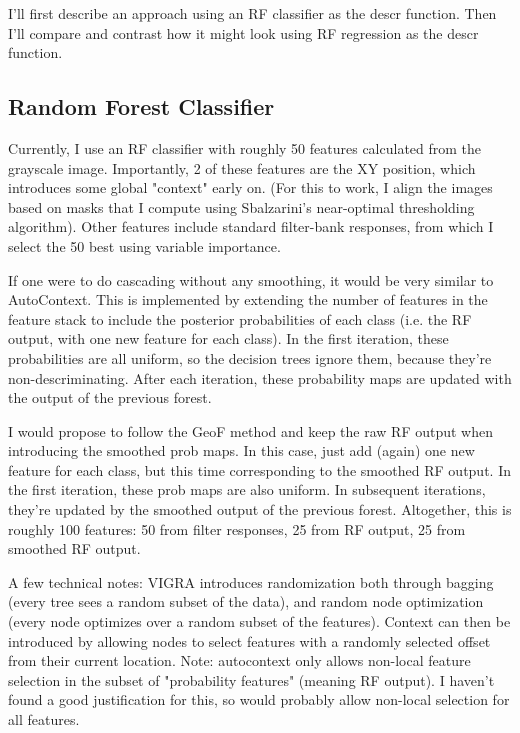 I'll first describe an approach using an RF classifier as the descr function.  Then I'll compare and contrast how it might look using RF regression as the descr function.

\subsection{Random Forest Classifier}

Currently, I use an RF classifier with roughly 50 features calculated from the grayscale image.  Importantly, 2 of these features are the XY position, which introduces some global "context" early on.  (For this to work, I align the images based on masks that I compute using Sbalzarini's near-optimal thresholding algorithm).  Other features include standard filter-bank responses, from which I select the 50 best using variable importance.

If one were to do cascading without any smoothing, it would be very similar to AutoContext.  This is implemented by extending the number of features in the feature stack to include the posterior probabilities of each class (i.e. the RF output, with one new feature for each class).  In the first iteration, these probabilities are all uniform, so the decision trees ignore them, because they're non-descriminating.  After each iteration, these probability maps are updated with the output of the previous forest.

I would propose to follow the GeoF method and keep the raw RF output when introducing the smoothed prob maps.  In this case, just add (again) one new feature for each class, but this time corresponding to the smoothed RF output.  In the first iteration, these prob maps are also uniform.  In subsequent iterations, they're updated by the smoothed output of the previous forest.  Altogether, this is roughly 100 features: 50 from filter responses, 25 from RF output, 25 from smoothed RF output.

A few technical notes: VIGRA introduces randomization both through bagging (every tree sees a random subset of the data), and random node optimization (every node optimizes over a random subset of the features).  Context can then be introduced by allowing nodes to select features with a randomly selected offset from their current location.  Note: autocontext only allows non-local feature selection in the subset of "probability features" (meaning RF output).  I haven't found a good justification for this, so would probably allow non-local selection for all features.

